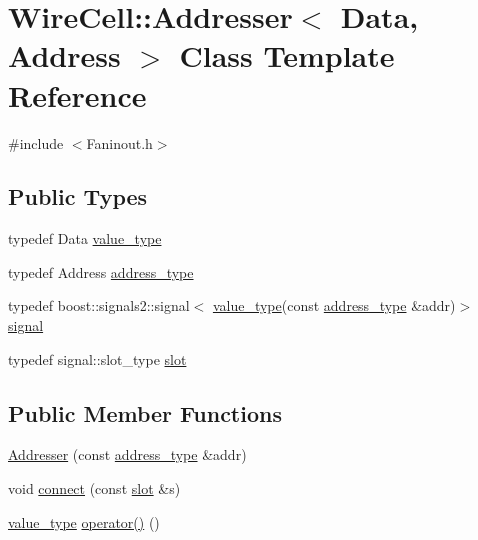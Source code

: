 \hypertarget{class_wire_cell_1_1_addresser}{}\section{Wire\+Cell\+:\+:Addresser$<$ Data, Address $>$ Class Template Reference}
\label{class_wire_cell_1_1_addresser}


{\ttfamily \#include $<$Faninout.\+h$>$}

\subsection*{Public Types}
\begin{DoxyCompactItemize}
\item 
typedef Data \hyperlink{class_wire_cell_1_1_addresser_a125c54e88bc3ed2233b1730e0a19d82b}{value\+\_\+type}
\item 
typedef Address \hyperlink{class_wire_cell_1_1_addresser_af284800d5e9ccf8b92d3456888969e75}{address\+\_\+type}
\item 
typedef boost\+::signals2\+::signal$<$ \hyperlink{class_wire_cell_1_1_addresser_a125c54e88bc3ed2233b1730e0a19d82b}{value\+\_\+type}(const \hyperlink{class_wire_cell_1_1_addresser_af284800d5e9ccf8b92d3456888969e75}{address\+\_\+type} \&addr)$>$ \hyperlink{class_wire_cell_1_1_addresser_aa72cf5fb36dc246686aabfecdb621ea3}{signal}
\item 
typedef signal\+::slot\+\_\+type \hyperlink{class_wire_cell_1_1_addresser_a3c52496ae06c731123d9d7d8ba426ac3}{slot}
\end{DoxyCompactItemize}
\subsection*{Public Member Functions}
\begin{DoxyCompactItemize}
\item 
\hyperlink{class_wire_cell_1_1_addresser_a868e4dbaf25c16637e4d953be219a56f}{Addresser} (const \hyperlink{class_wire_cell_1_1_addresser_af284800d5e9ccf8b92d3456888969e75}{address\+\_\+type} \&addr)
\item 
void \hyperlink{class_wire_cell_1_1_addresser_ad391fb735381e4f23b37e45d9c18699c}{connect} (const \hyperlink{class_wire_cell_1_1_addresser_a3c52496ae06c731123d9d7d8ba426ac3}{slot} \&s)
\item 
\hyperlink{class_wire_cell_1_1_addresser_a125c54e88bc3ed2233b1730e0a19d82b}{value\+\_\+type} \hyperlink{class_wire_cell_1_1_addresser_a0ca706eb9f4e16fc5ebc8e8930683e3b}{operator()} ()
\end{DoxyCompactItemize}


